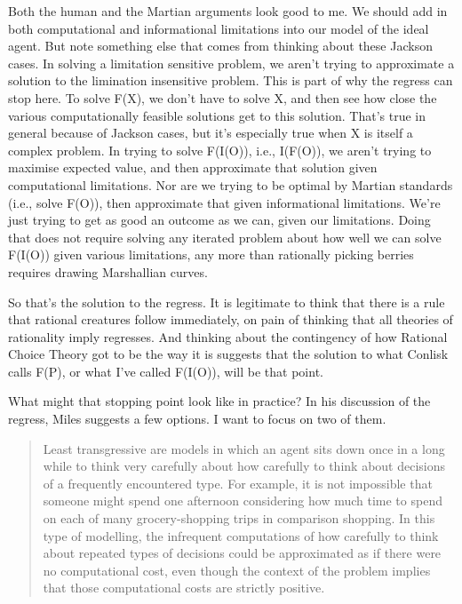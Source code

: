 \documentclass[
  11pt,
]{book}
\begin{document}
Both the human and the Martian arguments look good to me. We should add in both computational and informational limitations into our model of the ideal agent. But note something else that comes from thinking about these Jackson cases. In solving a limitation sensitive problem, we aren't trying to approximate a solution to the limination insensitive problem. This is part of why the regress can stop here. To solve F(X), we don't have to solve X, and then see how close the various computationally feasible solutions get to this solution. That's true in general because of Jackson cases, but it's especially true when X is itself a complex problem. In trying to solve F(I(O)), i.e., I(F(O)), we aren't trying to maximise expected value, and then approximate that solution given computational limitations. Nor are we trying to be optimal by Martian standards (i.e., solve F(O)), then approximate that given informational limitations. We're just trying to get as good an outcome as we can, given our limitations. Doing that does not require solving any iterated problem about how well we can solve F(I(O)) given various limitations, any more than rationally picking berries requires drawing Marshallian curves.

So that's the solution to the regress. It is legitimate to think that there is a rule that rational creatures follow immediately, on pain of thinking that all theories of rationality imply regresses. And thinking about the contingency of how Rational Choice Theory got to be the way it is suggests that the solution to what Conlisk calls F(P), or what I've called F(I(O)), will be that point.

What might that stopping point look like in practice? In his discussion of the regress, Miles \citet{Kimball2015} suggests a few options. I want to focus on two of them.

\begin{quote}
Least transgressive are models in which an agent sits down once in a long while to think very carefully about how carefully to think about decisions of a frequently encountered type. For example, it is not impossible that someone might spend one afternoon considering how much time to spend on each of many grocery-shopping trips in comparison shopping. In this type of modelling, the infrequent computations of how carefully to think about repeated types of decisions could be approximated as if there were no computational cost, even though the context of the problem implies that those computational costs are strictly positive. \citep[ 174]{Kimball2015}
\end{quote}
\end{document}
